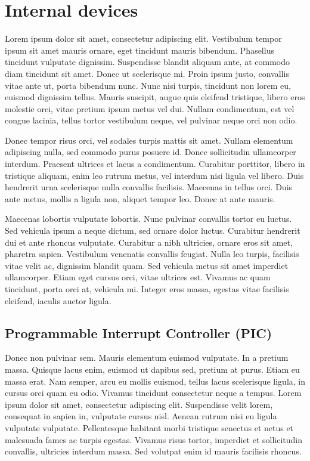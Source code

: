 \documentclass[a4paper,twocolumn,12pt]{article}
\begin{document}
\section{Internal devices}

 Lorem ipsum dolor sit amet, consectetur adipiscing elit. Vestibulum tempor ipsum sit amet mauris ornare, eget tincidunt mauris bibendum. Phasellus tincidunt vulputate dignissim. Suspendisse blandit aliquam ante, at commodo diam tincidunt sit amet. Donec ut scelerisque mi. Proin ipsum justo, convallis vitae ante ut, porta bibendum nunc. Nunc nisi turpis, tincidunt non lorem eu, euismod dignissim tellus. Mauris suscipit, augue quis eleifend tristique, libero eros molestie orci, vitae pretium ipsum metus vel dui. Nullam condimentum, est vel congue lacinia, tellus tortor vestibulum neque, vel pulvinar neque orci non odio.

Donec tempor risus orci, vel sodales turpis mattis sit amet. Nullam elementum adipiscing nulla, sed commodo purus posuere id. Donec sollicitudin ullamcorper interdum. Praesent ultrices et lacus a condimentum. Curabitur porttitor, libero in tristique aliquam, enim leo rutrum metus, vel interdum nisi ligula vel libero. Duis hendrerit urna scelerisque nulla convallis facilisis. Maecenas in tellus orci. Duis ante metus, mollis a ligula non, aliquet tempor leo. Donec at ante mauris.

Maecenas lobortis vulputate lobortis. Nunc pulvinar convallis tortor eu luctus. Sed vehicula ipsum a neque dictum, sed ornare dolor luctus. Curabitur hendrerit dui et ante rhoncus vulputate. Curabitur a nibh ultricies, ornare eros sit amet, pharetra sapien. Vestibulum venenatis convallis feugiat. Nulla leo turpis, facilisis vitae velit ac, dignissim blandit quam. Sed vehicula metus sit amet imperdiet ullamcorper. Etiam eget cursus orci, vitae ultrices est. Vivamus ac quam tincidunt, porta orci at, vehicula mi. Integer eros massa, egestas vitae facilisis eleifend, iaculis auctor ligula. 

\subsection{Programmable Interrupt Controller (PIC)}

Donec non pulvinar sem. Mauris elementum euismod vulputate. In a pretium massa. Quisque lacus enim, euismod ut dapibus sed, pretium at purus. Etiam eu massa erat. Nam semper, arcu eu mollis euismod, tellus lacus scelerisque ligula, in cursus orci quam eu odio. Vivamus tincidunt consectetur neque a tempus. Lorem ipsum dolor sit amet, consectetur adipiscing elit. Suspendisse velit lorem, consequat in sapien in, vulputate cursus nisl. Aenean rutrum nisi eu ligula vulputate vulputate. Pellentesque habitant morbi tristique senectus et netus et malesuada fames ac turpis egestas. Vivamus risus tortor, imperdiet et sollicitudin convallis, ultricies interdum massa. Sed volutpat enim id mauris facilisis rhoncus.
\end{document}
